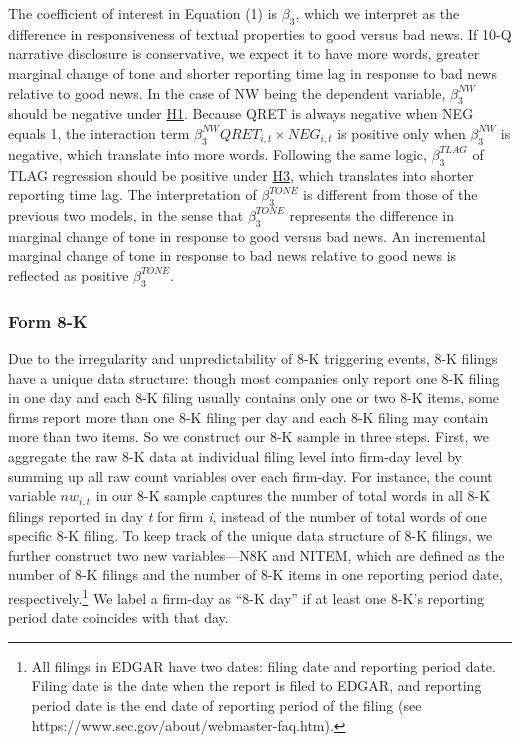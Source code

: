 \documentclass[letterpaper,11pt]{article}
\begin{document}
\begin{spacing}{1.5}
The coefficient of interest in Equation (1) is $\beta_3$, which we interpret as the difference in responsiveness of textual properties to good versus bad news. If 10-Q narrative disclosure is conservative, we expect it to have more words, greater marginal change of tone and shorter reporting time lag in response to bad news relative to good news. In the case of NW being the dependent variable, $\beta_3^{NW}$ should be negative under \hyperref[h1]{H1}. Because QRET is always negative when NEG equals 1, the interaction term $\beta_3^{NW}QRET_{i,t}\times NEG_{i,t}$ is positive only when $\beta_3^{NW}$ is negative, which translate into more words. Following the same logic, $\beta_3^{TLAG}$ of TLAG regression should be positive under \hyperref[h3]{H3}, which translates into shorter reporting time lag. The interpretation of $\beta_3^{TONE}$ is different from those of the previous two models, in the sense that $\beta_3^{TONE}$ represents the difference in marginal change of tone in response to good versus bad news. An incremental marginal change of tone in response to bad news relative to good news is reflected as positive $\beta_3^{TONE}$.

\subsubsection{Form 8-K} \label{sec3.3.2}
\noindent Due to the irregularity and unpredictability of 8-K triggering events, 8-K filings have a unique data structure: though most companies only report one 8-K filing in one day and each 8-K filing usually contains only one or two 8-K items, some firms report more than one 8-K filing per day and each 8-K filing may contain more than two items. So we construct our 8-K sample in three steps. First, we aggregate the raw 8-K data at individual filing level into firm-day level by summing up all raw count variables over each firm-day. For instance, the count variable $nw_{i,t}$ in our 8-K sample captures the number of total words in all 8-K filings reported in day \textit{t} for firm \textit{i}, instead of the number of total words of one specific 8-K filing. To keep track of the unique data structure of 8-K filings, we further construct two new variables---N8K and NITEM, which are defined as the number of 8-K filings and the number of 8-K items in one reporting period date, respectively.\footnote{All filings in EDGAR have two dates: filing date and reporting period date. Filing date is the date when the report is filed to EDGAR, and reporting period date is the end date of reporting period of the filing (see https://www.sec.gov/about/webmaster-faq.htm).} We label a firm-day as ``8-K day” if at least one 8-K's reporting period date coincides with that day.


\end{spacing}
\end{document}
